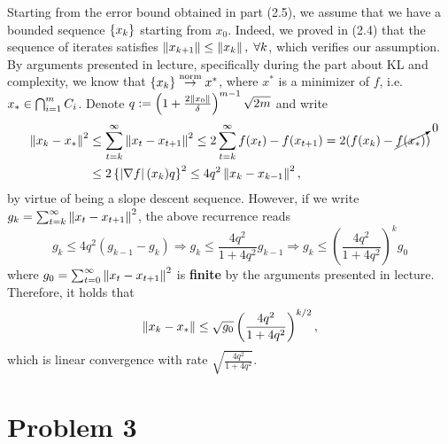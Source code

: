 \documentclass[10pt]{article}
\begin{document}
Starting from the error bound obtained in part (2.5), we assume that we have
a bounded sequence $\left\{ x_k \right\}$ starting from $x_0$. Indeed, we proved in (2.4)
that the sequence of iterates satisfies $\left \| x_{k+1} \right \| \leq \left \| x_k \right \|, \;
\forall k$, which verifies our assumption. By arguments presented in lecture,
specifically during the part about KL and complexity, we know that $\left\{ x_k \right\}
\overset{\text{norm}}{\to} x^*$, where $x^*$ is a minimizer of $f$, i.e.
$x_* \in \operatorname*{\bigcap}_{i=1}^m C_i$. Denote
\(
    q := \left(1 + \frac{2 \left \| x_0 \right \|}{\delta}\right)^{m-1} \sqrt{2m}
\) and write
\begin{align*}
    \left \| x_k - x_* \right \|^2 &\leq \sum_{t=k}^{\infty} \left \| x_t - x_{t + 1} \right \|^2
    \leq 2 \sum_{t=k}^{\infty} f(x_t) - f(x_{t+1}) = 2 (f(x_k) -
    \cancelto{0}{f(x_*)}) \\
    &\leq 2 \left\{  \left| \nabla f \right|(x_k) q  \right\}^2 \leq 4q^2 \left \| x_k -
    x_{k-1} \right \|^2,
\end{align*}
by virtue of being a slope descent sequence. However, if we write $g_k =
\sum_{t=k}^{\infty} \left \| x_t - x_{t+1} \right \|^2$, the above recurrence reads
\[
    g_k \leq 4 q^2 \left(g_{k-1} - g_{k}\right) \Rightarrow
    g_k \leq \frac{4q^2}{1 + 4q^2} g_{k-1} \Rightarrow
    g_k \leq \left(\frac{4q^2}{1 + 4q^2}\right)^k g_0
\]
where $g_0 = \sum_{t=0}^{\infty} \left \| x_t - x_{t+1} \right \|^2$ is \textbf{finite} by
the arguments presented in lecture. Therefore, it holds that
\[
    \left \| x_k - x_* \right \| \leq \sqrt{g_0} \left( \frac{4q^2}{1 + 4 q^2}
    \right)^{k/2},
\]
which is linear convergence with rate $\sqrt{\frac{4q^2}{1 + 4q^2}}$.
\section*{Problem 3}
\end{document}
